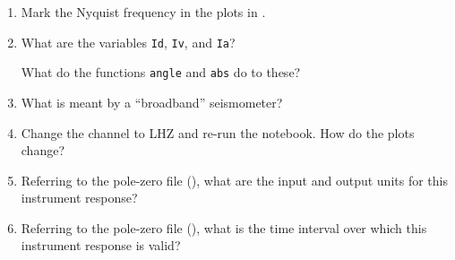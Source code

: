 \documentclass[11pt,titlepage,fleqn]{article}
\begin{document}
\begin{enumerate}
\item Mark the Nyquist frequency in the plots in .

\item What are the variables \verb+Id+, \verb+Iv+, and \verb+Ia+?

What do the functions \verb+angle+ and \verb+abs+ do to these?

\item What is meant by a ``broadband'' seismometer?

\item Change the channel to LHZ and re-run the notebook. How do the plots change?

\item Referring to the pole-zero file (), what are the input and output units for this instrument response?

\item Referring to the pole-zero file (), what is the time interval over which this instrument response is valid?


\end{enumerate}


\iffalse
\section{Deconvolve instrument response for a seismogram}

FUTURE PART OF THE LAB (see also \verb+lab_sumatra.pdf+):
%
\begin{verbatim}
otime = 2004-12-26 00:58:50 = 732307.040856 [matlab days]
station CAN.G
duration = 10 days
start time: t1 = otime - duration - 1
end time: t2 = t1 + duration
channels: LHZ, LHE, LHN

Deconvolve instrument response on all three components.
Plot the amplitude spectrum over 0.2--1.0 mHz to show the gravest mode peaks.
Show what the main arrival looks like at bandpass 50-500s with and without decon.
Rotate to R and T to isolate SH waves.
[Having the previous 10 days allows for the noise analysis in hw_sumatraA.pdf]
\end{verbatim}
\fi



\pagebreak
\end{document}
